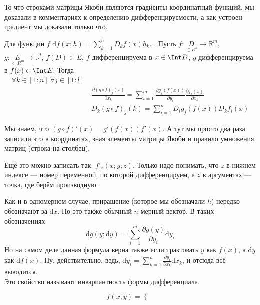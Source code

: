 \documentclass{article}
\begin{document}
\begin{itemize}
\begin{Proof}
            То что строками матрицы Якоби являются градиенты координатный функций, мы доказали в комментариях к определению дифференцируемости, а как устроен градиент мы доказали только что.
        \end{Proof}
        \thm Для функции $f$ $\mathrm df(x;h)=\sum\limits_{k=1}^nD_kf(x)h_k$.
        \thm {}. Пусть $f\colon\underset{\subset R^n}D\to\mathbb R^m$, $g\colon\underset{\subset R^m}E\to\mathbb R^l$, $f(D)\subset E$, $f$ дифференцируема в $x\in\Int D$, $g$ дифференцируема в $f(x)\in\Int E$. Тогда
        \[\begin{split}
            \forall k\in[1:n]~\forall j\in[1:l]~&\\
            &\frac{\partial(g\circ f)_j(x)}{\partial x_k}=\sum\limits_{i=1}^m\frac{\partial g_j(f(x))}{\partial y_i}\frac{\partial f_i(x)}{\partial x_k}\\
            &D_k(g\circ f)_j(k)=\sum\limits_{i=1}^nD_ig_j(f(x))D_kf_i(x)
        \end{split}\]
        \begin{Proof}
            Мы знаем, что $(g\circ f)'(x)=g'(f(x))f'(x)$. А тут мы просто два раза записали это в координатах, зная элементы матрицы Якоби и правило умножения матриц (строка на столбец).
        \end{Proof}
        \begin{Comment}
            Ещё это можно записать так: $f'_z(x;y;z)$. Только надо понимать, что $z$ в нижнем индексе --- номер переменной, по которой дифференцируем, а $z$ в аргументах --- точка, где берём производную.
        \end{Comment}
        \begin{Comment}
            Как и в одномерном случае, приращение (которое мы обозначали $h$) нередко обозначают за $\mathrm dx$. Но это также обычный $n$-мерный вектор. В таких обозначениях
            \[
            \mathrm dg(y;\mathrm dy)=\sum\limits_{i=1}^m\frac{\partial g(y)}{\partial y_i}\mathrm dy_i
            \]
            Но на самом деле данная формула верна также если трактовать $y$ как $f(x)$, а $\mathrm dy$ как $\mathrm df(x)$. Ну, действительно, ведь, $\mathrm dy_i=\sum\limits_{k=1}^n\frac{\partial y_i}{\partial x_k}\mathrm dx_k$, и отсюда всё выводится.\\
            Это свойство называют инвариантность формы дифференциала.
        \end{Comment}
        \begin{Example}
            $$f(x;y)=\begin{cases}

\end{cases}$$
\end{Example}
\end{itemize}
\end{document}
